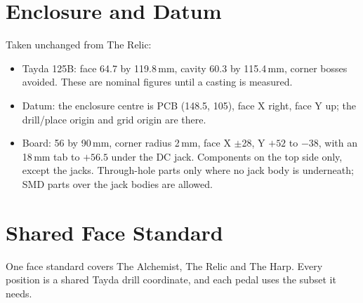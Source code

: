 \section{Enclosure and Datum}
Taken unchanged from The Relic:
\begin{itemize}
  \item Tayda 125B: face 64.7 by 119.8\,mm, cavity 60.3 by 115.4\,mm, corner bosses avoided. These are nominal figures until a casting is measured.
  \item Datum: the enclosure centre is PCB (148.5, 105), face X right, face Y up; the drill/place origin and grid origin are there.
  \item Board: 56 by 90\,mm, corner radius 2\,mm, face X $\pm$28, Y $+52$ to $-38$, with an 18\,mm tab to $+56.5$ under the DC jack. Components on the top side only, except the jacks. Through-hole parts only where no jack body is underneath; SMD parts over the jack bodies are allowed.
\end{itemize}

\section{Shared Face Standard}
One face standard covers The Alchemist, The Relic and The Harp. Every position is a shared Tayda drill coordinate, and each pedal uses the subset it needs.

